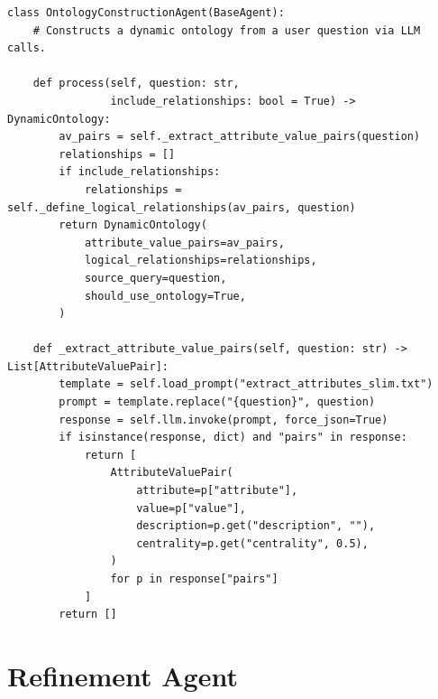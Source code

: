 \begin{lstlisting}[style=pythonstyle,
caption={Ontology Agent: \texttt{process} and
\texttt{\_extract\_attribute\_value\_pairs} methods.},
label={lst:code-ontology}]
class OntologyConstructionAgent(BaseAgent):
    # Constructs a dynamic ontology from a user question via LLM calls.

    def process(self, question: str,
                include_relationships: bool = True) -> DynamicOntology:
        av_pairs = self._extract_attribute_value_pairs(question)
        relationships = []
        if include_relationships:
            relationships = self._define_logical_relationships(av_pairs, question)
        return DynamicOntology(
            attribute_value_pairs=av_pairs,
            logical_relationships=relationships,
            source_query=question,
            should_use_ontology=True,
        )

    def _extract_attribute_value_pairs(self, question: str) -> List[AttributeValuePair]:
        template = self.load_prompt("extract_attributes_slim.txt")
        prompt = template.replace("{question}", question)
        response = self.llm.invoke(prompt, force_json=True)
        if isinstance(response, dict) and "pairs" in response:
            return [
                AttributeValuePair(
                    attribute=p["attribute"],
                    value=p["value"],
                    description=p.get("description", ""),
                    centrality=p.get("centrality", 0.5),
                )
                for p in response["pairs"]
            ]
        return []
\end{lstlisting}

\section{Refinement Agent}\label{app:code-refinement}


